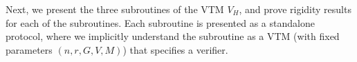 \medskip
Next, we present the three subroutines of the VTM $V_H$, and prove rigidity results for each of the subroutines. Each subroutine is presented as a standalone protocol, where we implicitly understand the subroutine as a VTM (with fixed parameters $(n,r,G,V,M)$) that specifies a verifier. 
%
%
%
%
%
%
%
%
%




